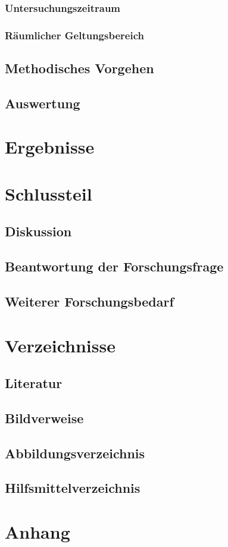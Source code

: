 \documentclass[12pt,a4paper]{article}        %
\begin{document}
\subsubsection{Untersuchungszeitraum}
\subsubsection{Räumlicher Geltungsbereich}
\subsection{Methodisches Vorgehen}
\subsection{Auswertung}
\pagebreak
\section{Ergebnisse}
\pagebreak
\section{Schlussteil}
\subsection{Diskussion}
\subsection{Beantwortung der Forschungsfrage}
\subsection{Weiterer Forschungsbedarf}

\pagebreak
\section{Verzeichnisse}
\subsection{Literatur}
\printbibliography[heading=none, nottype=artwork]
\subsection{Bildverweise}
\printbibliography[heading=none, type=artwork] %
\subsection{Abbildungsverzeichnis}
\listoffigures[heading=none]
\subsection{Hilfsmittelverzeichnis}

\section{Anhang}
\end{document}
